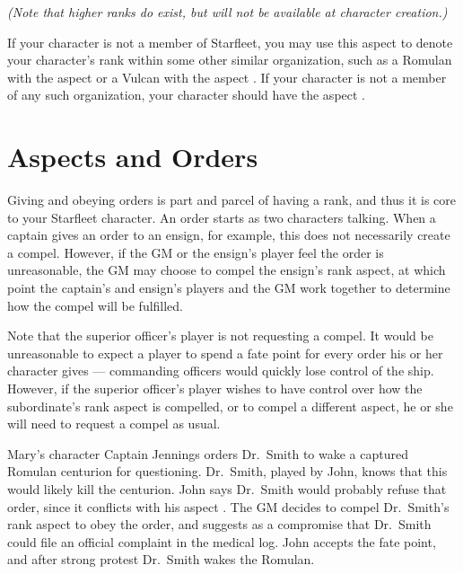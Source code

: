 \documentclass[12pt,titlepage,openany]{book}
\begin{document}
\noindent \emph{(Note that higher ranks do exist, but will not be available at
character creation.)}

\vspace{1em}

If your character is not a member of Starfleet, you may use this aspect to
denote your character's rank within some other similar organization, such as a
Romulan with the aspect  or a Vulcan with the aspect
. If your character is not a member of any such
organization, your character should have the aspect .

\section{Aspects and Orders}\label{sec:aspects-orders}

Giving and obeying orders is part and parcel of having a rank, and thus it is
core to your Starfleet character. An order starts as two characters talking.
When a captain gives an order to an ensign, for example, this does not
necessarily create a compel. However, if the GM or the ensign's player feel the
order is unreasonable, the GM may choose to compel the ensign's rank aspect,
at which point the captain's and ensign's players and the GM work together to
determine how the compel will be fulfilled.

Note that the superior officer's player is not requesting a compel. It would be
unreasonable to expect a player to spend a fate point for every order his or
her character gives --- commanding officers would quickly lose control of the
ship. However, if the superior officer's player wishes to have control over
how the subordinate's rank aspect is compelled, or to compel a different
aspect, he or she will need to request a compel as usual.

\begin{example}
    Mary's character Captain Jennings orders Dr.\ Smith to wake a captured
    Romulan centurion for questioning. Dr.\ Smith, played by John, knows that
    this would likely kill the centurion. John says Dr.\ Smith would probably
    refuse that order, since it conflicts with his aspect .
    The GM decides to compel Dr.\ Smith's rank aspect  to
    obey the order, and suggests as a compromise that Dr.\ Smith could file an
    official complaint in the medical log. John accepts the fate point, and
    after strong protest Dr.\ Smith wakes the Romulan.
\end{example}
\end{document}
